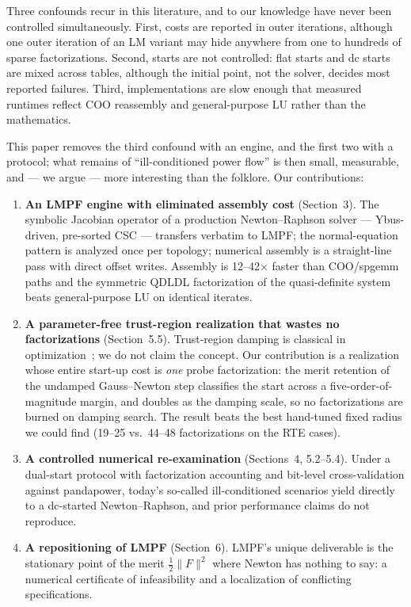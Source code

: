 \documentclass[11pt]{article}
\begin{document}
Three confounds recur in this literature, and to our knowledge have never
been controlled simultaneously. First, costs are reported in outer
iterations, although one outer iteration of an LM variant may hide anywhere
from one to hundreds of sparse factorizations. Second, starts are not
controlled: flat starts and dc starts are mixed across tables, although the
initial point, not the solver, decides most reported failures. Third,
implementations are slow enough that measured runtimes reflect COO
reassembly and general-purpose LU rather than the mathematics.

This paper removes the third confound with an engine, and the first two
with a protocol; what remains of ``ill-conditioned power flow'' is then
small, measurable, and --- we argue --- more interesting than the folklore.
Our contributions:

\begin{enumerate}
\item \textbf{An LMPF engine with eliminated assembly cost}
  (Section~3). The symbolic Jacobian operator of a production
  Newton--Raphson solver --- Ybus-driven, pre-sorted CSC --- transfers
  verbatim to LMPF; the normal-equation pattern is analyzed once per
  topology; numerical assembly is a straight-line pass with direct offset
  writes. Assembly is 12--42$\times$ faster than COO/spgemm paths and the
  symmetric QDLDL factorization of the quasi-definite system beats
  general-purpose LU on identical iterates.
\item \textbf{A parameter-free trust-region realization that wastes no
  factorizations} (Section~5.5). Trust-region damping is classical in
  optimization~\cite{nocedal2006}; we do not claim the concept. Our
  contribution is a realization whose
  entire start-up cost is \emph{one} probe factorization: the merit
  retention of the undamped Gauss--Newton step classifies the start across
  a five-order-of-magnitude margin, and doubles as the damping scale,
  so no factorizations are burned on damping search. The result beats the
  best hand-tuned fixed radius we could find (19--25 vs.\ 44--48
  factorizations on the RTE cases).
\item \textbf{A controlled numerical re-examination} (Sections~4, 5.2--5.4).
  Under a dual-start protocol with factorization accounting and bit-level
  cross-validation against pandapower, today's so-called ill-conditioned
  scenarios yield directly to a dc-started Newton--Raphson, and prior
  performance claims do not reproduce.
\item \textbf{A repositioning of LMPF} (Section~6). LMPF's unique
  deliverable is the stationary point of the merit $\tfrac12\|F\|^2$ where
  Newton has nothing to say: a numerical certificate of infeasibility and a
  localization of conflicting specifications.
\end{enumerate}
\end{document}

